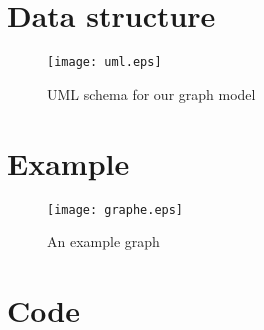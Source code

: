 \documentclass[a4paper,12pt]{article}
\begin{document}
\section{Data structure}

\begin{figure}[h]
  \center
  \texttt{[image: uml.eps]}
  \caption{\label{fig:uml} UML schema for our graph model}
\end{figure}

\section{Example}

\begin{figure}[h]
  \center
  \texttt{[image: graphe.eps]}
  \caption{\label{fig:graphe} An example graph}
\end{figure}

\section{Code}


\end{document}
